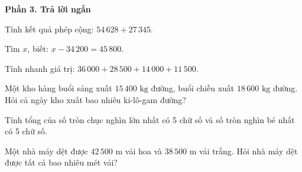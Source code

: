 \textbf{Phần 3. Trả lời ngắn}

\begin{ex} %
Tính kết quả phép cộng: $54\,628 + 27\,345$.
\end{ex}

\begin{ex} %
Tìm $x$, biết: $x - 34\,200 = 45\,800$.
\end{ex}

\begin{ex} %
Tính nhanh giá trị: $36\,000 + 28\,500 + 14\,000 + 11\,500$.
\end{ex}

\begin{ex} %
Một kho hàng buổi sáng xuất $15\,400\text{ kg}$ đường, buổi chiều xuất $18\,600\text{ kg}$ đường. Hỏi cả ngày kho xuất bao nhiêu ki-lô-gam đường?
\end{ex}

\begin{ex} %
Tính tổng của số tròn chục nghìn lớn nhất có 5 chữ số và số tròn nghìn bé nhất có 5 chữ số.
\end{ex}

\begin{ex} %
Một nhà máy dệt được $42\,500\text{ m}$ vải hoa và $38\,500\text{ m}$ vải trắng. Hỏi nhà máy dệt được tất cả bao nhiêu mét vải?
\end{ex}
